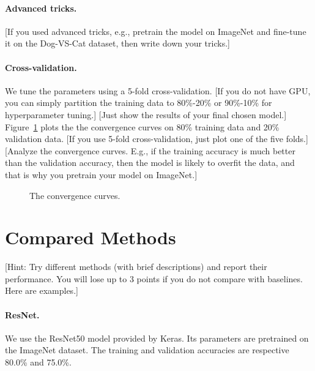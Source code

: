 \documentclass[11pt]{article}
\numberwithin{equation}{section}
\begin{document}
\paragraph{Advanced tricks.}
[If you used advanced tricks, e.g., pretrain the model on ImageNet and fine-tune it on the Dog-VS-Cat dataset, then write down your tricks.]

\paragraph{Cross-validation.}
We tune the parameters using a 5-fold cross-validation. [If you do not have GPU, you can simply partition the training data to 80\%-20\% or 90\%-10\% for hyperparameter tuning.]
[Just show the results of your final chosen model.]
Figure~\ref{fig:convergence} plots the the convergence curves on 80\% training data and 20\% validation data. [If you use 5-fold cross-validation, just plot one of the five folds.]
[Analyze the convergence curves. E.g., if the training accuracy is much better than the validation accuracy, then the model is likely to overfit the data, and that is why you pretrain your model on ImageNet.] 


\begin{figure}
	\begin{center}
	\end{center}
	\caption{The convergence curves.}
	\label{fig:convergence}
\end{figure}





\section{Compared Methods}


[Hint: Try different methods (with brief descriptions) and report their performance.
You will lose up to 3 points if you do not compare with baselines.
Here are examples.]


\paragraph{ResNet.}
We use the ResNet50 model provided by Keras. Its parameters are pretrained on the ImageNet dataset. The training and validation accuracies are respective 80.0\% and 75.0\%.
\end{document}
